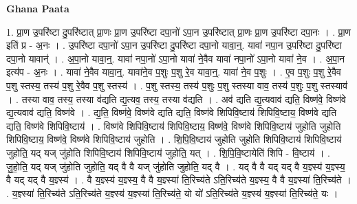 \documentclass[17pt]{extarticle}
\begin{document}
\textbf{Ghana Paata } \newline

1. प्रा॒ण उ॒परि॑ष्टा दु॒परि॑ष्टात् प्रा॒णः प्रा॒ण उ॒परि॑ष्टा दपा॒नो॑ ऽपा॒न उ॒परि॑ष्टात् प्रा॒णः प्रा॒ण उ॒परि॑ष्टा दपा॒नः । . प्रा॒ण इति॑ प्र - अ॒नः । . उ॒परि॑ष्टा दपा॒नो॑ ऽपा॒न उ॒परि॑ष्टा दु॒परि॑ष्टा दपा॒नो यावा॒न्॒. यावा॑ नपा॒न उ॒परि॑ष्टा दु॒परि॑ष्टा दपा॒नो यावान्॑ । . अ॒पा॒नो यावा॒न्॒. यावा॑ नपा॒नो॑ ऽपा॒नो यावा॑ ने॒वैव यावा॑ नपा॒नो॑ ऽपा॒नो यावा॑ ने॒व । . अ॒पा॒न इत्य॑प - अ॒नः । . यावा॑ ने॒वैव यावा॒न्॒. यावा॑ने॒व प॒शुः प॒शु रे॒व यावा॒न्॒. यावा॑ ने॒व प॒शुः । . ए॒व प॒शुः प॒शु रे॒वैव प॒शु स्तस्य॒ तस्य॑ प॒शु रे॒वैव प॒शु स्तस्य॑ । . प॒शु स्तस्य॒ तस्य॑ प॒शुः प॒शु स्तस्या वाव॒ तस्य॑ प॒शुः प॒शु स्तस्याव॑ । . तस्या वाव॒ तस्य॒ तस्या व॑द्यति द्य॒त्यव॒ तस्य॒ तस्या व॑द्यति । . अव॑ द्यति द्य॒त्यवाव॑ द्यति॒ विष्ण॑वे॒ विष्ण॑वे द्य॒त्यवाव॑ द्यति॒ विष्ण॑वे । . द्य॒ति॒ विष्ण॑वे॒ विष्ण॑वे द्यति द्यति॒ विष्ण॑वे शिपिवि॒ष्टाय॑ शिपिवि॒ष्टाय॒ विष्ण॑वे द्यति द्यति॒ विष्ण॑वे शिपिवि॒ष्टाय॑ । . विष्ण॑वे शिपिवि॒ष्टाय॑ शिपिवि॒ष्टाय॒ विष्ण॑वे॒ विष्ण॑वे शिपिवि॒ष्टाय॑ जुहोति जुहोति शिपिवि॒ष्टाय॒ विष्ण॑वे॒ विष्ण॑वे शिपिवि॒ष्टाय॑ जुहोति । . शि॒पि॒वि॒ष्टाय॑ जुहोति जुहोति शिपिवि॒ष्टाय॑ शिपिवि॒ष्टाय॑ जुहोति॒ यद् यज् जु॑होति शिपिवि॒ष्टाय॑ शिपिवि॒ष्टाय॑ जुहोति॒ यत् । . शि॒पि॒वि॒ष्टायेति॑ शिपि - वि॒ष्टाय॑ । . जु॒हो॒ति॒ यद् यज् जु॑होति जुहोति॒ यद् वै वै यज् जु॑होति जुहोति॒ यद् वै । . यद् वै वै यद् यद् वै य॒ज्ञ्स्य॑ य॒ज्ञ्स्य॒ वै यद् यद् वै य॒ज्ञ्स्य॑ । . वै य॒ज्ञ्स्य॑ य॒ज्ञ्स्य॒ वै वै य॒ज्ञ्स्या॑ ति॒रिच्य॑ते ऽति॒रिच्य॑ते य॒ज्ञ्स्य॒ वै वै य॒ज्ञ्स्या॑ ति॒रिच्य॑ते । . य॒ज्ञ्स्या॑ ति॒रिच्य॑ते ऽति॒रिच्य॑ते य॒ज्ञ्स्य॑ य॒ज्ञ्स्या॑ ति॒रिच्य॑ते॒ यो यो॑ ऽति॒रिच्य॑ते य॒ज्ञ्स्य॑ य॒ज्ञ्स्या॑ ति॒रिच्य॑ते॒ यः । \newline
\end{document}
